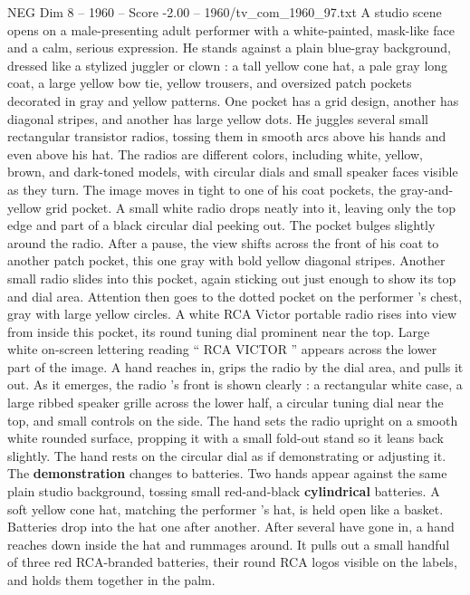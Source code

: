 \begin{textsample}{NEG Dim 8 – 1960 – Score -2.00 – 1960/tv\_com\_1960\_97.txt}  \label{ex:f8_neg_011}
A studio scene opens on a male-presenting adult performer with a white-painted, mask-like face and a calm, serious expression.
He stands against a plain blue-gray background, dressed like a stylized juggler or clown : a tall yellow cone hat, a pale gray long coat, a large yellow bow tie, yellow trousers, and oversized patch pockets decorated in gray and yellow patterns.
One pocket has a grid design, another has diagonal stripes, and another has large yellow dots.
He juggles several small rectangular transistor radios, tossing them in smooth arcs above his hands and even above his hat.
The radios are different colors, including white, yellow, brown, and dark-toned models, with circular dials and small speaker faces visible as they turn.
The image moves in tight to one of his coat pockets, the gray-and-yellow grid pocket.
A small white radio drops neatly into it, leaving only the top edge and part of a black circular dial peeking out.
The pocket bulges slightly around the radio.
After a pause, the view shifts across the front of his coat to another patch pocket, this one gray with bold yellow diagonal stripes.
Another small radio slides into this pocket, again sticking out just enough to show its top and dial area.
Attention then goes to the dotted pocket on the performer ’s chest, gray with large yellow circles.
A white RCA Victor portable radio rises into view from inside this pocket, its round tuning dial prominent near the top.
Large white on-screen lettering reading “ RCA VICTOR ” appears across the lower part of the image.
A hand reaches in, grips the radio by the dial area, and pulls it out.
As it emerges, the radio ’s front is shown clearly : a rectangular white case, a large ribbed speaker grille across the lower half, a circular tuning dial near the top, and small controls on the side.
The hand sets the radio upright on a smooth white rounded surface, propping it with a small fold-out stand so it leans back slightly.
The hand rests on the circular dial as if demonstrating or adjusting it.
The \textbf{demonstration} changes to batteries.
Two hands appear against the same plain studio background, tossing small red-and-black \textbf{cylindrical} batteries.
A soft yellow cone hat, matching the performer ’s hat, is held open like a basket.
Batteries drop into the hat one after another.
After several have gone in, a hand reaches down inside the hat and rummages around.
It pulls out a small handful of three red RCA-branded batteries, their round RCA logos visible on the labels, and holds them together in the palm.

\end{textsample}
